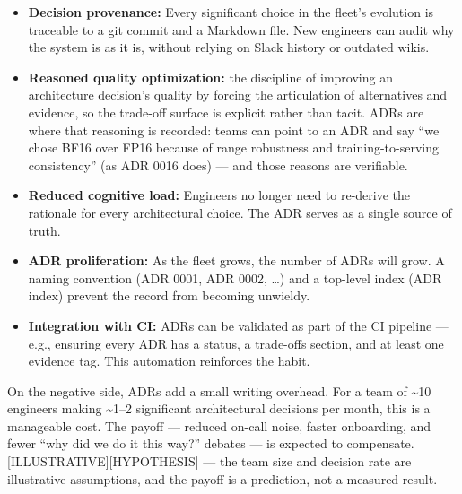 \begin{itemize}
\tightlist
\item
  \textbf{Decision provenance:} Every significant choice in the fleet's
  evolution is traceable to a git commit and a Markdown file. New
  engineers can audit why the system is as it is, without relying on
  Slack history or outdated wikis.
\item
  \textbf{Reasoned quality optimization:} the discipline of improving an
  architecture decision's quality by forcing the articulation of
  alternatives and evidence, so the trade-off surface is explicit rather
  than tacit. ADRs are where that reasoning is recorded: teams can point
  to an ADR and say ``we chose BF16 over FP16 because of range
  robustness and training-to-serving consistency'' (as ADR 0016 does)
  --- and those reasons are verifiable.
\item
  \textbf{Reduced cognitive load:} Engineers no longer need to re-derive
  the rationale for every architectural choice. The ADR serves as a
  single source of truth.
\item
  \textbf{ADR proliferation:} As the fleet grows, the number of ADRs
  will grow. A naming convention (ADR 0001, ADR 0002, \ldots) and a
  top-level index (ADR index) prevent the record from becoming unwieldy.
\item
  \textbf{Integration with CI:} ADRs can be validated as part of the CI
  pipeline --- e.g., ensuring every ADR has a status, a trade-offs
  section, and at least one evidence tag. This automation reinforces the
  habit.
\end{itemize}

On the negative side, ADRs add a small writing overhead. For a team of
\textasciitilde10 engineers making \textasciitilde1--2 significant
architectural decisions per month, this is a manageable cost. The payoff
--- reduced on-call noise, faster onboarding, and fewer ``why did we do
it this way?'' debates --- is expected to compensate.
\mbox{{[}ILLUSTRATIVE{]}}\hspace{0pt}\mbox{{[}HYPOTHESIS{]}} --- the team size and decision rate
are illustrative assumptions, and the payoff is a prediction, not a
measured result.

